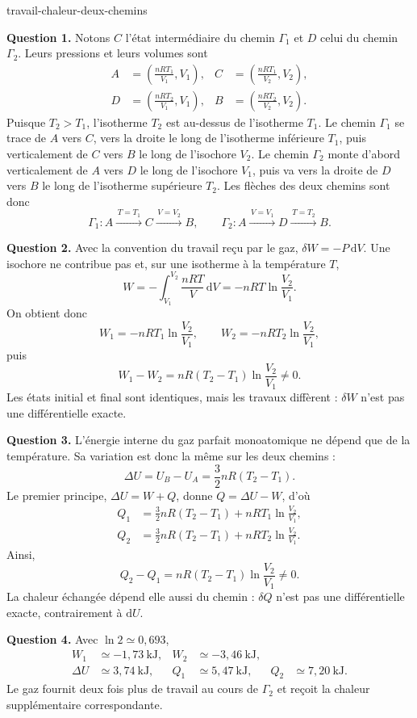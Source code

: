 \begin{exo}{travail-chaleur-deux-chemins}
\begin{solution}
\textbf{Question 1.} Notons $C$ l'état intermédiaire du chemin $\Gamma_1$
et $D$ celui du chemin $\Gamma_2$. Leurs pressions et leurs volumes sont
\[
\begin{aligned}
A&=\left(\frac{nRT_1}{V_1},V_1\right),&
C&=\left(\frac{nRT_1}{V_2},V_2\right),\\
D&=\left(\frac{nRT_2}{V_1},V_1\right),&
B&=\left(\frac{nRT_2}{V_2},V_2\right).
\end{aligned}
\]
Puisque $T_2>T_1$, l'isotherme $T_2$ est au-dessus de l'isotherme $T_1$.
Le chemin $\Gamma_1$ se trace de $A$ vers $C$, vers la droite le long de
l'isotherme inférieure $T_1$, puis verticalement de $C$ vers $B$ le long de
l'isochore $V_2$. Le chemin $\Gamma_2$ monte d'abord verticalement de $A$
vers $D$ le long de l'isochore $V_1$, puis va vers la droite de $D$ vers $B$
le long de l'isotherme supérieure $T_2$. Les flèches des deux chemins sont
donc
\[
\Gamma_1:A\xrightarrow{\,T=T_1\,}C\xrightarrow{\,V=V_2\,}B,
\qquad
\Gamma_2:A\xrightarrow{\,V=V_1\,}D\xrightarrow{\,T=T_2\,}B.
\]

\textbf{Question 2.} Avec la convention du travail reçu par le gaz,
$\delta W=-P\,\mathrm{d}V$. Une isochore ne contribue pas et, sur une
isotherme à la température $T$,
\[
W=-\int_{V_1}^{V_2}\frac{nRT}{V}\,\mathrm{d}V
=-nRT\ln\frac{V_2}{V_1}.
\]
On obtient donc
\[
W_1=-nRT_1\ln\frac{V_2}{V_1},
\qquad
W_2=-nRT_2\ln\frac{V_2}{V_1},
\]
puis
\[
W_1-W_2
=nR(T_2-T_1)\ln\frac{V_2}{V_1}\neq 0.
\]
Les états initial et final sont identiques, mais les travaux diffèrent :
$\delta W$ n'est pas une différentielle exacte.

\textbf{Question 3.} L'énergie interne du gaz parfait monoatomique ne dépend
que de la température. Sa variation est donc la même sur les deux chemins :
\[
\Delta U=U_B-U_A=\frac{3}{2}nR(T_2-T_1).
\]
Le premier principe, $\Delta U=W+Q$, donne $Q=\Delta U-W$, d'où
\[
\begin{aligned}
Q_1&=\frac{3}{2}nR(T_2-T_1)
     +nRT_1\ln\frac{V_2}{V_1},\\
Q_2&=\frac{3}{2}nR(T_2-T_1)
     +nRT_2\ln\frac{V_2}{V_1}.
\end{aligned}
\]
Ainsi,
\[
Q_2-Q_1=nR(T_2-T_1)\ln\frac{V_2}{V_1}\neq 0.
\]
La chaleur échangée dépend elle aussi du chemin : $\delta Q$ n'est pas une
différentielle exacte, contrairement à $\mathrm{d}U$.

\textbf{Question 4.} Avec $\ln 2\simeq0{,}693$,
\[
\begin{aligned}
W_1&\simeq-1{,}73\ \mathrm{kJ},&
W_2&\simeq-3{,}46\ \mathrm{kJ},\\
\Delta U&\simeq3{,}74\ \mathrm{kJ},&
Q_1&\simeq5{,}47\ \mathrm{kJ},&
Q_2&\simeq7{,}20\ \mathrm{kJ}.
\end{aligned}
\]
Le gaz fournit deux fois plus de travail au cours de $\Gamma_2$ et reçoit
la chaleur supplémentaire correspondante.
\end{solution}
\end{exo}

